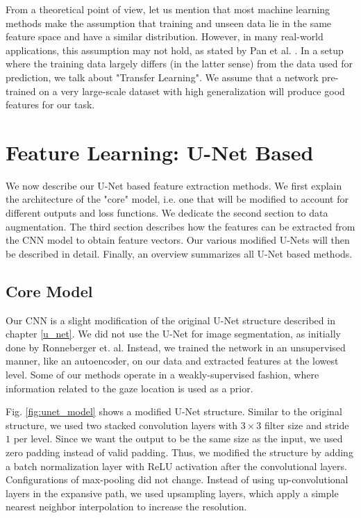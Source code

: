 From a theoretical point of view, let us mention that most machine learning methods make the assumption that training and unseen data lie in the same feature space and have a similar distribution.
However, in many real-world applications, this assumption may not hold, as stated by Pan et al. \cite{pan2010}.
In a setup where the training data largely differs (in the latter sense) from the data used for prediction, we talk about "Transfer Learning". We assume that a network pre-trained on a very large-scale dataset with high generalization will produce good features for our task.

\section{Feature Learning: U-Net Based} \label{ch:unet_based}
We now describe our U-Net based feature extraction methods. We first explain the architecture of the "core" model, i.e. one that will be modified to account for different outputs and loss functions. We dedicate the second section to data augmentation. The third section describes how the features can be extracted from the CNN model to obtain feature vectors. Our various modified U-Nets will then be described in detail. Finally, an overview summarizes all U-Net based methods.

\subsection{Core Model} \label{model}
Our CNN is a slight modification of the original U-Net structure described in chapter \ref{u_net}. We did not use the U-Net for image segmentation, as initially done by Ronneberger et. al. Instead, we trained the network in an unsupervised manner, like an autoencoder, on our data and extracted features at the lowest level. Some of our methods operate in a weakly-supervised fashion, where information related to the gaze location is used as a prior.

Fig. \ref{fig:unet_model} shows a modified U-Net structure. Similar to the original structure, we used two stacked convolution layers with $3 \times 3$ filter size and stride $1$ per level. Since we want the output to be the same size as the input, we used zero padding instead of valid padding. Thus, we modified the structure by adding a batch normalization layer with ReLU activation after the convolutional layers. Configurations of max-pooling did not change. Instead of using up-convolutional layers in the expansive path, we used upsampling layers, which apply a simple nearest neighbor interpolation to increase the resolution.


